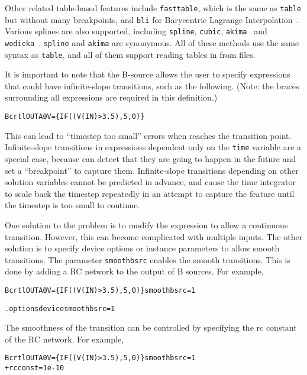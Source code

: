 \begin{Device}
Other related table-based features include \texttt{fasttable}, which is the same as \texttt{table} 
but without many breakpoints, and \texttt{bli} for Barycentric Lagrange 
Interpolation~\cite{Berrut_barycentriclagrange}.  Various splines are also supported,
including \texttt{spline}, \texttt{cubic}, \texttt{akima}~\cite{10.1145/321607.321609} 
and \texttt{wodicka}~\cite{Engeln1996}.  \texttt{spline} and \texttt{akima} are synonymous.    
All of these methods use the same syntax as \texttt{table}, and all of them support 
reading tables in from files.

It is important to note that the B-source allows the user to specify
expressions that could have infinite-slope transitions, such as the
following.  (Note: the braces surrounding all expressions are required in this definition.)
\begin{alltt} Bcrtl OUTA 0 V=\{ IF( (V(IN) > 3.5), 5, 0 ) \} \end{alltt}
This can lead to ``timestep too small'' errors when \Xyce{} reaches the
transition point.  Infinite-slope transitions in expressions dependent only on
the \texttt{time} variable are a special case, because \Xyce{} can detect that
they are going to happen in the future and set a ``breakpoint'' to capture
them.  Infinite-slope transitions depending on other solution variables cannot
be predicted in advance, and cause the time integrator to scale back the
timestep repeatedly in an attempt to capture the feature until the timestep is
too small to continue.

One solution to the problem is to modify the expression to allow a continuous transition. 
However, this can become complicated with multiple inputs. The other solution is to specify
device options or instance parameters to allow smooth transitions. The parameter
\texttt{smoothbsrc} enables the smooth transitions. This is done by adding a RC network to the  
output of B sources. For example,

\begin{alltt} Bcrtl OUTA 0 V=\{ IF( (V(IN) > 3.5), 5, 0 ) \} smoothbsrc=1 \end{alltt}

\begin{alltt} .options device  smoothbsrc=1 \end{alltt}

The smoothness of the transition can be controlled by specifying the rc constant of 
the RC network. For example, 

\begin{alltt} Bcrtl OUTA 0 V=\{ IF( (V(IN) > 3.5), 5, 0 ) \} smoothbsrc=1   
 + rcconst = 1e-10 \end{alltt}


\end{Device}
